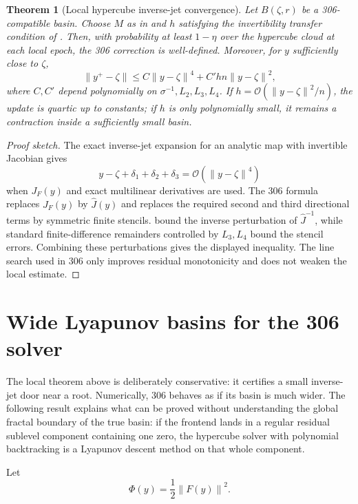 \documentclass[11pt]{article}
\newtheorem{theorem}[definition]{Theorem}
\newcommand{\OO}{\mathcal O}
\newcommand{\norm}[1]{\left\lVert #1\right\rVert}
\begin{document}
\begin{theorem}[Local hypercube inverse-jet convergence]\label{thm:local}
Let $B(\zeta,r)$ be a 306-compatible basin.  Choose $M$ as in  and $h$ satisfying the invertibility transfer condition of .  Then, with probability at least $1-\eta$ over the hypercube cloud at each local epoch, the 306 correction is well-defined.  Moreover, for $y$ sufficiently close to $\zeta$,
\[
        \norm{y^+-\zeta}
        \le C\norm{y-\zeta}^4 + C' h n\norm{y-\zeta}^2,
\]
where $C,C'$ depend polynomially on $\sigma^{-1},L_2,L_3,L_4$.  If $h=\OO(\norm{y-\zeta}^2/n)$, the update is quartic up to constants; if $h$ is only polynomially small, it remains a contraction inside a sufficiently small basin.
\end{theorem}

\begin{proof}[Proof sketch]
The exact inverse-jet expansion for an analytic map with invertible Jacobian gives
\[
        y-\zeta+\delta_1+\delta_2+\delta_3=\OO(\norm{y-\zeta}^4)
\]
when $J_F(y)$ and exact multilinear derivatives are used.  The 306 formula replaces $J_F(y)$ by $\widehat J(y)$ and replaces the required second and third directional terms by symmetric finite stencils.   bound the inverse perturbation of $\widehat J^{-1}$, while standard finite-difference remainders controlled by $L_3,L_4$ bound the stencil errors.  Combining these perturbations gives the displayed inequality.  The line search used in 306 only improves residual monotonicity and does not weaken the local estimate.
\end{proof}


\section{Wide Lyapunov basins for the 306 solver}\label{sec:wide-basin}

The local theorem above is deliberately conservative: it certifies a small inverse-jet door near a root.  Numerically, 306 behaves as if its basin is much wider.  The following result explains what can be proved without understanding the global fractal boundary of the true basin: if the frontend lands in a regular residual sublevel component containing one zero, the hypercube solver with polynomial backtracking is a Lyapunov descent method on that whole component.

Let
\[
        \Phi(y)=\frac12\norm{F(y)}^2.
\]
\end{document}
